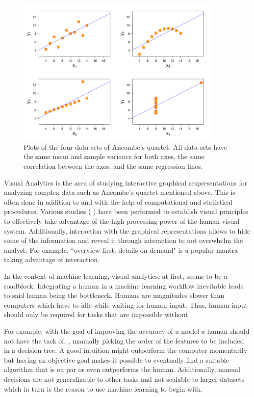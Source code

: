 \begin{figure}[t]
\centering
\includegraphics[width=0.9\textwidth,valign=t]{tex/introduction/ancombe.png}
\caption[Ancombe's quartet.]{
Plots of the four data sets of Ancombe's quartet\footnotemark. All data sets have the same mean and sample variance for both axes, the same correlation between the axes, and the same regression lines.
}
\label{figs:ancombe}
\end{figure}

Visual Analytics is the area of studying interactive graphical respresentations for analyzing complex data such as Ancombe's quartet mentioned above.
This is often done in addition to and with the help of computational and statistical procedures.
Various studies (
) have been performed to establish visual principles to effectively take advantage of the high processing power of the human visual system.
Additionally, interaction with the graphical representations allows to hide some of the information and reveal it through interaction to not overwhelm the analyst.
For example, ``overview first; details on demand"  is a popular mantra taking advantage of interaction.

In the context of machine learning, visual analytics, at first, seems to be a roadblock.
Integrating a human in a machine learning workflow inevitable leads to said human being the bottleneck.
Humans are magnitudes slower than computers which have to idle while waiting for human input.
Thus, human input should only be required for tasks that are impossible without.

For example, with the goal of improving the accuracy of a model a human should not have the task of, \eg, manually picking the order of the features to be included in a decision tree.
A good intuition might outperform the computer momentarily but having an objective goal makes it possible to eventually find a suitable algorithm that is en par or even outperforms the human.
Additionally, manual decisions are not generalizable to other tasks and not scalable to larger datasets which in turn is the reason to use machine learning to begin with.

